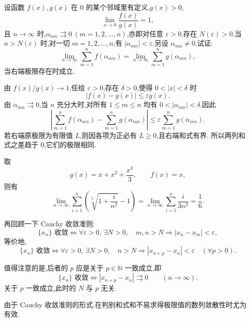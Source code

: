 \begin{example}
  设函数 $f(x),g(x)$ 在 $0$ 的某个邻域里有定义,$g(x)>0$,
  \[
    \lim\limits_{x\to0}\dfrac{f(x)}{g(x)}=1,
  \]
  且 $n\to\infty$ 时,$\alpha_{mn}\rightrightarrows0\ (m=1,2,\ldots,n)$,亦即对任意
  $\varepsilon>0$,存在 $N(\varepsilon)>0$,当 $n>N(\varepsilon)$ 时,对一切
  $m=1,2,\ldots,n$,有 $|\alpha_{mn}|<\varepsilon$.另设 $\alpha_{mn}\neq0$,试证:
  \[
    \lim\limits_{n\to\infty}\sum\limits_{m=1}^n f(\alpha_{mn})
    =
    \lim\limits_{n\to\infty}\sum\limits_{m=1}^n g(\alpha_{mn}),
  \]
  当右端极限存在时成立.
\end{example}
\exampleblank

\begin{solution}
  由 $f(x)/g(x)\to1$,任给 $\varepsilon>0$,存在 $\delta>0$,使得
  $0<|x|<\delta$ 时
  \[
    |f(x)-g(x)|\leq\varepsilon g(x).
  \]
  由 $\alpha_{mn}\rightrightarrows0$,当 $n$ 充分大时,对所有
  $1\leq m\leq n$ 均有 $0<|\alpha_{mn}|<\delta$.因此
  \[
    \left|\sum\limits_{m=1}^n f(\alpha_{mn})
    -\sum\limits_{m=1}^n g(\alpha_{mn})\right|
    \leq\varepsilon\sum\limits_{m=1}^n g(\alpha_{mn}).
  \]
  若右端原极限为有限值 $L$,则因各项为正必有 $L\geq0$,且右端和式有界.
  所以两列和式之差趋于 $0$,它们的极限相同.
\end{solution}

\begin{remark}
  取
  \[
    g(x)=x+x^2+\dfrac{x^3}{3},\qquad f(x)=x,
  \]
  则有
  \[
    \lim\limits_{n\to\infty}\sum\limits_{i=1}^n
    \left(\sqrt[3]{1+\dfrac{i}{n^2}}-1\right)
    =
    \lim\limits_{n\to\infty}\sum\limits_{i=1}^n\dfrac{i}{3n^2}
    =\dfrac{1}{6}.
  \]
\end{remark}




再回顾一下 Cauchy 收敛准则:
\[
  \{x_n\}\text{ 收敛}
  \iff
  \forall\varepsilon>0,\ \exists N>0,
  \quad m,n>N\Longrightarrow |x_n-x_m|<\varepsilon,
\]
等价地,
\[
  \{x_n\}\text{ 收敛}
  \iff
  \forall\varepsilon>0,\ \exists N>0,
  \quad n>N\Longrightarrow |x_{n+p}-x_n|<\varepsilon\quad(\forall p>0).
\]

\begin{remark}
  值得注意的是,后者的 $p$ 应是关于 $p\in\mathbb N$ 一致成立,即
  \[
    \{x_n\}\text{ 收敛}
    \iff
    |x_{n+p}-x_n|\rightrightarrows0\qquad(n\to\infty).
  \]
  关于 $p$ 一致成立,此时的 $N$ 与 $p$ 无关.
\end{remark}

由于 Cauchy 收敛准则的形式,在判别和式和不易求得极限值的数列敛散性时尤为有效.

